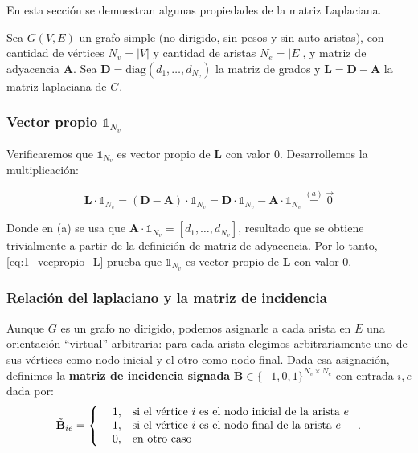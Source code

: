 \documentclass{article}
\begin{document}
En esta sección se demuestran algunas propiedades de la matriz Laplaciana.

\newcommand{\ones}[1]{\mathbb{1}_{#1}}
\newcommand{\lap}{\mathbf{L}}
\newcommand{\diag}{\mathbf{D}}
\newcommand{\adj}{\mathbf{A}}
\newcommand{\bm}{\tilde{\mathbf{B}}}
\newcommand{\x}{\mathbf{x}}

Sea $G(V,E)$ un grafo simple (no dirigido, sin pesos y sin auto-aristas), con cantidad de vértices $N_v = |V|$ y cantidad de aristas $N_e = |E|$, y matriz de adyacencia $\mathbf{A}$. Sea $\mathbf{D} = \text{diag}(d_{1},\dots, d_{N_v})$ la matriz de grados y $\mathbf{L}=\mathbf{D}- \mathbf{A}$ la matriz laplaciana de $G$.

\subsubsection{Vector propio $\ones{N_v}$}
\label{subsec:vector_propio_1}

Verificaremos que $\ones{N_v}$ es vector propio de $\lap$ con valor 0. Desarrollemos la multiplicación:

\begin{equation}
    \lap \cdot \ones{N_v} = (\diag - \adj) \cdot \ones{N_v}  = \diag \cdot \ones{N_v} - \adj \cdot \ones{N_v} \stackrel{(a)}{=} \vec{0}
    \label{eq:1_vecpropio_L}
\end{equation}

Donde en (a) se usa que $\adj \cdot \ones{N_v} = [d_1, \dots, d_{N_v}]$, resultado que
se obtiene trivialmente a partir de la definición de matriz de adyacencia.
Por lo tanto, \eqref{eq:1_vecpropio_L} prueba que $\ones{N_v}$ es vector propio de $\lap$ con valor 0.

\subsubsection{Relación del laplaciano y la matriz de incidencia}

Aunque $G$ es un grafo no dirigido, podemos asignarle a cada arista en $E$ una orientación ``virtual'' arbitraria: para cada arista elegimos arbitrariamente uno de sus vértices como nodo inicial y el otro como nodo final. Dada esa asignación, definimos la \textbf{matriz de incidencia signada} $\bm \in \{-1,0,1\}^{N_v\times N_e}$ con entrada $i,e$ dada por:
\begin{equation}
    \bm_{ie} = \left\lbrace
    \begin{array}{r l}
        1,  & \text{si el vértice } i \text{ es el nodo inicial de la arista } e \\
        -1, & \text{si el vértice } i \text{ es el nodo final de la arista } e   \\
        0,  & \text{en otro caso}
    \end{array}
    \right. .
    \label{eq:matrix_incidencia}
\end{equation}
\end{document}
